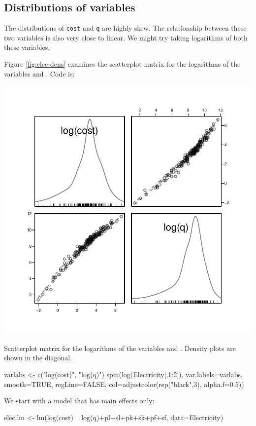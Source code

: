 \subsection*{Distributions of variables}

The distributions of \texttt{cost} and \texttt{q} are highly skew.
The relationship between these two variables is also very close to
linear.  We might try taking logarithms of both these variables.

Figure \ref{fig:elec-dens} examines the scatterplot matrix for the
logarithms of the variables  and .
\noindent
Code is:
\begin{marginfigure}[-3.5cm]
\begin{Schunk}


\centerline{\includegraphics[width=\textwidth]{figs/8-spm-cost-q-1} }

\end{Schunk}
  \caption{Scatterplot matrix for the logarithms of the variables
     and . Density plots are shown in the
    diagonal.\label{fig:elec-dens}}
\end{marginfigure}
\begin{Schunk}
\begin{Sinput}
varlabs <- c("log(cost)", "log(q)")
spm(log(Electricity[,1:2]), var.labels=varlabs,
    smooth=TRUE, regLine=FALSE,
    col=adjustcolor(rep("black",3), alpha.f=0.5))
\end{Sinput}
\end{Schunk}
We start with a model that has main effects only:
\begin{Schunk}
\begin{Sinput}
elec.lm <- lm(log(cost) ~ log(q)+pl+sl+pk+sk+pf+sf,
              data=Electricity)
\end{Sinput}
\end{Schunk}

